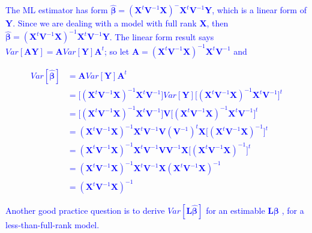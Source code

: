 \documentclass[
  12pt,
]{article}
\begin{document}
\textcolor{blue}{The ML estimator has form $\pmb {\hat \beta} = (\pmb X^t \pmb V^{-1}\pmb X)^-\pmb X^t\pmb V^{-1}\pmb Y$, which is a linear form of $\pmb Y$. Since we are dealing with a model with full rank $\pmb X$, then $\pmb {\hat \beta} = (\pmb X^t \pmb V^{-1} \pmb X)^{-1}\pmb X^t \pmb V^{-1}\pmb Y$. The linear form result says $Var[\pmb{AY}] = \pmb A Var[\pmb Y] \pmb A^t$; so let $\pmb A = (\pmb X^t \pmb V^{-1} \pmb X)^{-1} \pmb X^t \pmb V^{-1}$ and 

$$
\begin{aligned}
Var[\pmb {\hat \beta}] 
&= \pmb A Var[\pmb Y] \pmb A^t\\
&= \Big[(\pmb X^t \pmb V^{-1} \pmb X)^{-1} \pmb X^t \pmb V^{-1} \Big] Var[\pmb Y] \Big[(\pmb X^t \pmb V^{-1} \pmb X)^{-1} \pmb X^t \pmb V^{-1} \Big]^t\\
&= \Big[(\pmb X^t \pmb V^{-1} \pmb X)^{-1} \pmb X^t \pmb V^{-1} \Big] \pmb V \Big[(\pmb X^t \pmb V^{-1} \pmb X)^{-1} \pmb X^t \pmb V^{-1} \Big]^t\\
&= (\pmb X^t \pmb V^{-1} \pmb X)^{-1} \pmb X^t \pmb V^{-1} \pmb V (\pmb V^{-1})^{t} \pmb X  \Big[(\pmb X^t \pmb V^{-1} \pmb X)^{-1} \Big]^t\\
&= (\pmb X^t \pmb V^{-1} \pmb X)^{-1} \pmb X^t \pmb V^{-1} \pmb V \pmb V^{-1} \pmb X  \Big[(\pmb X^t \pmb V^{-1} \pmb X)^{-1} \Big]^t\\
&= (\pmb X^t \pmb V^{-1} \pmb X)^{-1} \pmb X^t \pmb V^{-1} \pmb X  (\pmb X^t \pmb V^{-1} \pmb X)^{-1} \\
&= (\pmb X^t \pmb V^{-1} \pmb X)^{-1} 
\end{aligned}
$$


Another good practice question is to derive $Var[\pmb {L\hat \beta}]$ for an estimable $\pmb {L\beta}$ , for a less-than-full-rank model.}
\end{document}
